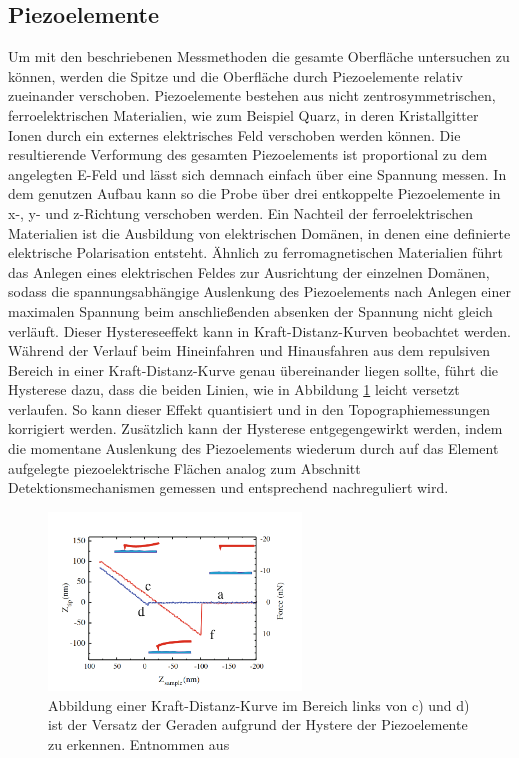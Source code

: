       
      
      
      \newpage
      \subsection{Piezoelemente}
          Um mit den beschriebenen Messmethoden die gesamte Oberfläche untersuchen zu können, werden die Spitze und die Oberfläche durch Piezoelemente relativ zueinander verschoben. Piezoelemente bestehen aus 
          nicht zentrosymmetrischen, ferroelektrischen Materialien, wie zum Beispiel Quarz, in deren Kristallgitter Ionen durch ein externes elektrisches Feld verschoben werden können. Die resultierende 
          Verformung des gesamten Piezoelements ist proportional zu dem angelegten E-Feld und lässt sich demnach einfach über eine Spannung messen. In dem genutzen Aufbau kann so die Probe über drei 
          entkoppelte Piezoelemente in x-, y- und z-Richtung verschoben werden. Ein Nachteil der ferroelektrischen Materialien ist die Ausbildung von elektrischen Domänen, in denen eine definierte elektrische
          Polarisation entsteht. Ähnlich zu ferromagnetischen Materialien führt das Anlegen eines elektrischen Feldes zur Ausrichtung der einzelnen Domänen, sodass die spannungsabhängige Auslenkung des
          Piezoelements nach Anlegen einer maximalen Spannung beim anschließenden absenken der Spannung nicht gleich verläuft. Dieser Hystereseeffekt kann in Kraft-Distanz-Kurven beobachtet werden. 
          Während der Verlauf beim Hineinfahren und Hinausfahren aus dem repulsiven Bereich in einer Kraft-Distanz-Kurve genau übereinander liegen sollte, führt die
          Hysterese dazu, dass die beiden Linien, wie in Abbildung \ref{fig:hysterese} leicht versetzt verlaufen. So kann dieser Effekt quantisiert und in den Topographiemessungen korrigiert werden. Zusätzlich kann der Hysterese entgegengewirkt werden, 
          indem die momentane Auslenkung des Piezoelements wiederum durch auf das Element aufgelegte piezoelektrische Flächen analog zum Abschnitt Detektionsmechanismen gemessen und entsprechend nachreguliert wird. 


          \FloatBarrier

          \begin{figure}[h]
            \centering
            \includegraphics[width = 0.6\textwidth]{pictures/hysterese.png}
            \caption{Abbildung einer Kraft-Distanz-Kurve im Bereich links von c) und d) ist der Versatz der Geraden aufgrund der Hystere der Piezoelemente zu erkennen. Entnommen aus \cite{voigtlander_scanning_2015}}
            \label{fig:hysterese}
          \end{figure}
        
